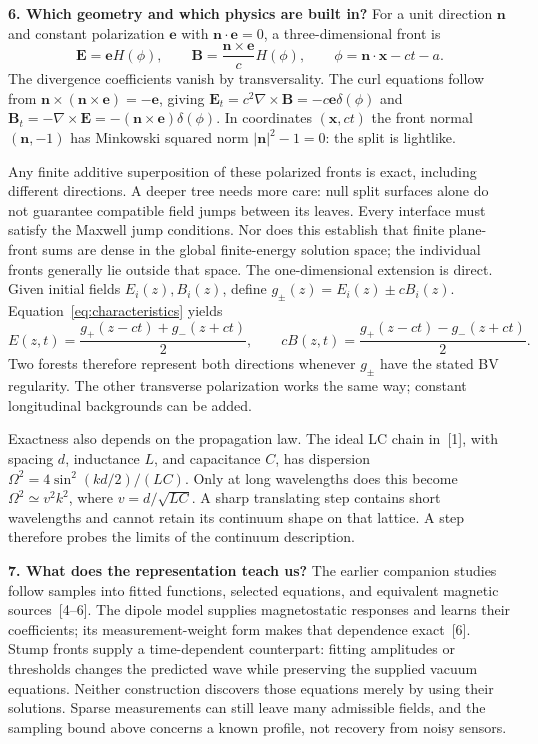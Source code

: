 \documentclass[11pt,letterpaper]{article}
\newcommand{\E}{\mathbf E}
\newcommand{\B}{\mathbf B}
\begin{document}
\textbf{6. Which geometry and which physics are built in?}
For a unit direction $\mathbf n$ and constant polarization $\mathbf e$ with
$\mathbf n\cdot\mathbf e=0$, a three-dimensional front is
\begin{equation}
 \E=\mathbf e H(\phi),\qquad
 \B=\frac{\mathbf n\times\mathbf e}{c}H(\phi),\qquad
 \phi=\mathbf n\cdot\mathbf x-ct-a.
 \label{eq:null}
\end{equation}
The divergence coefficients vanish by transversality. The curl equations follow
from $\mathbf n\times(\mathbf n\times\mathbf e)=-\mathbf e$, giving
$\E_t=c^2\nabla\times\B=-c\mathbf e\delta(\phi)$ and
$\B_t=-\nabla\times\E=-(\mathbf n\times\mathbf e)\delta(\phi)$.
In coordinates $(\mathbf x,ct)$ the front normal $(\mathbf n,-1)$ has
Minkowski squared norm $|\mathbf n|^2-1=0$: the split is lightlike.

Any finite additive superposition of these polarized fronts is exact, including
different directions. A deeper tree needs more care: null split surfaces alone
do not guarantee compatible field jumps between its leaves. Every interface
must satisfy the Maxwell jump conditions. Nor does this establish that finite
plane-front sums are dense in the global finite-energy solution space; the
individual fronts generally lie outside that space. The one-dimensional
extension is direct. Given initial fields $E_i(z),B_i(z)$,
define $g_\pm(z)=E_i(z)\pm cB_i(z)$. Equation~\eqref{eq:characteristics} yields
\begin{equation}
 E(z,t)=\frac{g_+(z-ct)+g_-(z+ct)}2,\qquad
 cB(z,t)=\frac{g_+(z-ct)-g_-(z+ct)}2.
\end{equation}
Two forests therefore represent both directions whenever $g_\pm$ have the stated
BV regularity. The other transverse polarization works the same way; constant
longitudinal backgrounds can be added.

Exactness also depends on the propagation law. The ideal LC chain in~[1], with
spacing $d$, inductance $L$, and capacitance $C$, has dispersion
$\Omega^2=4\sin^2(kd/2)/(LC)$. Only at long wavelengths does this become
$\Omega^2\simeq v^2k^2$, where $v=d/\sqrt{LC}$. A sharp translating step
contains short wavelengths and cannot retain its continuum shape on that
lattice. A step therefore probes the limits of the continuum description.

\textbf{7. What does the representation teach us?}
The earlier companion studies follow samples into fitted functions, selected
equations, and equivalent magnetic sources~[4--6]. The dipole model supplies
magnetostatic responses and learns their coefficients; its measurement-weight
form makes that dependence exact~[6]. Stump fronts supply a time-dependent
counterpart: fitting amplitudes or thresholds changes the predicted wave while
preserving the supplied vacuum equations. Neither construction discovers those
equations merely by using their solutions. Sparse measurements can still leave
many admissible fields, and the sampling bound above concerns a known profile,
not recovery from noisy sensors.
\end{document}
